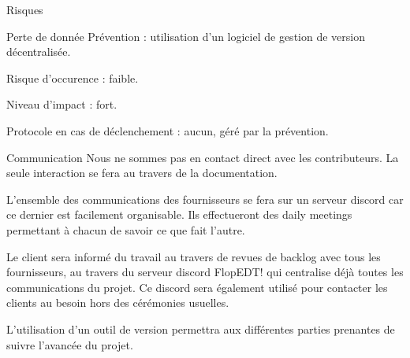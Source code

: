 \documentclass[]{article}
\begin{document}
\begin{section}{Risques}
        \begin{subsection}{Perte de donnée}
            Prévention : utilisation d’un logiciel de gestion de version décentralisée.

            Risque d’occurence : faible.

            Niveau d’impact : fort.

            Protocole en cas de déclenchement : aucun, géré par la prévention.
        \end{subsection}
    \end{section}

    \begin{section}{Communication}
        Nous ne sommes pas en contact direct avec les contributeurs. La seule interaction se fera au travers
        de la documentation.

        L’ensemble des communications des fournisseurs se fera sur un serveur discord car ce dernier est
        facilement organisable. Ils effectueront des daily meetings permettant à chacun de savoir ce que fait
        l’autre.

        Le client sera informé du travail au travers de revues de backlog avec tous les fournisseurs, au
        travers du serveur discord FlopEDT! qui centralise déjà toutes les communications du projet. Ce
        discord sera également utilisé pour contacter les clients au besoin hors des cérémonies usuelles.

        L’utilisation d’un outil de version permettra aux différentes parties prenantes de suivre l’avancée du
        projet.
        
    \end{section}
\end{document}
